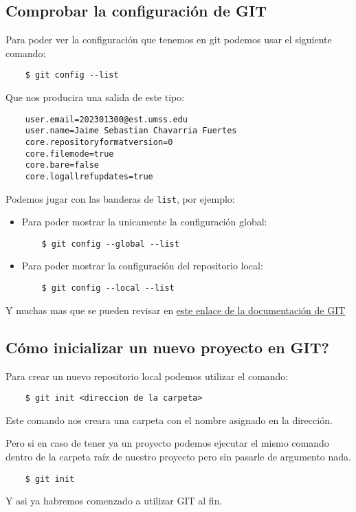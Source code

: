     \subsection{Comprobar la configuraci\'on de GIT}
        Para poder ver la configuraci\'on que tenemos en git podemos usar el siguiente comando:
            \begin{lstlisting}
    $ git config --list
            \end{lstlisting}
        Que nos producira una salida de este tipo:
            \begin{lstlisting}
    user.email=202301300@est.umss.edu
    user.name=Jaime Sebastian Chavarria Fuertes
    core.repositoryformatversion=0
    core.filemode=true
    core.bare=false
    core.logallrefupdates=true
            \end{lstlisting}
        Podemos jugar con las banderas de \texttt{list}, por ejemplo:
            \begin{itemize}
                \item Para poder mostrar la unicamente la configuraci\'on global:
                    \begin{lstlisting}
    $ git config --global --list
                    \end{lstlisting}
                \item Para poder mostrar la configuraci\'on del repositorio local:
                    \begin{lstlisting}
    $ git config --local --list
                    \end{lstlisting}
            \end{itemize}
        Y muchas mas que se pueden revisar en \href{https://git-scm.com/docs/git-config}{este enlace de la documentaci\'on de GIT}
    
    \subsection{C\'omo inicializar un nuevo proyecto en GIT?}
        Para crear un nuevo repositorio local podemos utilizar el comando:
            \begin{lstlisting}
    $ git init <direccion de la carpeta>
            \end{lstlisting}
        Este comando nos creara una carpeta con el nombre asignado en la direcci\'on.

        Pero si en caso de tener ya un proyecto podemos ejecutar el mismo comando dentro de la carpeta ra\'iz de nuestro proyecto pero sin pasarle de argumento nada.
            \begin{lstlisting}
    $ git init
            \end{lstlisting}
        Y asi ya habremos comenzado a utilizar GIT al fin.